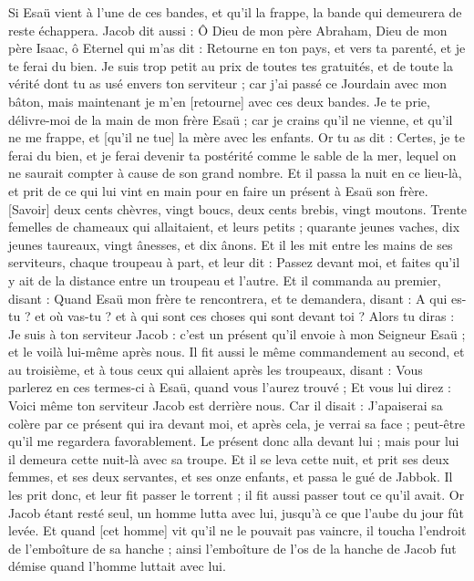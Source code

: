 \begin{multicols}{2}
Si Esaü vient à l'une de ces bandes, et qu'il la frappe, la bande qui demeurera de reste échappera.
Jacob dit aussi : Ô Dieu de mon père Abraham, Dieu de mon père Isaac, ô Eternel qui m'as dit : Retourne en ton pays, et vers ta parenté, et je te ferai du bien.
Je suis trop petit au prix de toutes tes gratuités, et de toute la vérité dont tu as usé envers ton serviteur ; car j'ai passé ce Jourdain avec mon bâton, mais maintenant je m'en [retourne] avec ces deux bandes.
Je te prie, délivre-moi de la main de mon frère Esaü ; car je crains qu'il ne vienne, et qu'il ne me frappe, et [qu'il ne tue] la mère avec les enfants.
Or tu as dit : Certes, je te ferai du bien, et je ferai devenir ta postérité comme le sable de la mer, lequel on ne saurait compter à cause de son grand nombre.
Et il passa la nuit en ce lieu-là, et prit de ce qui lui vint en main pour en faire un présent à Esaü son frère.
[Savoir] deux cents chèvres, vingt boucs, deux cents brebis, vingt moutons.
Trente femelles de chameaux qui allaitaient, et leurs petits ; quarante jeunes vaches, dix jeunes taureaux, vingt ânesses, et dix ânons.
Et il les mit entre les mains de ses serviteurs, chaque troupeau à part, et leur dit : Passez devant moi, et faites qu'il y ait de la distance entre un troupeau et l'autre.
Et il commanda au premier, disant : Quand Esaü mon frère te rencontrera, et te demandera, disant : A qui es-tu ? et où vas-tu ? et à qui sont ces choses qui sont devant toi ?
Alors tu diras : Je suis à ton serviteur Jacob : c'est un présent qu'il envoie à mon Seigneur Esaü ; et le voilà lui-même après nous.
Il fit aussi le même commandement au second, et au troisième, et à tous ceux qui allaient après les troupeaux, disant : Vous parlerez en ces termes-ci à Esaü, quand vous l'aurez trouvé ;
Et vous lui direz : Voici même ton serviteur Jacob est derrière nous. Car il disait : J'apaiserai sa colère par ce présent qui ira devant moi, et après cela, je verrai sa face ; peut-être qu'il me regardera favorablement.
Le présent donc alla devant lui ; mais pour lui il demeura cette nuit-là avec sa troupe.
Et il se leva cette nuit, et prit ses deux femmes, et ses deux servantes, et ses onze enfants, et passa le gué de Jabbok.
Il les prit donc, et leur fit passer le torrent ; il fit aussi passer tout ce qu'il avait.
Or Jacob étant resté seul, un homme lutta avec lui, jusqu'à ce que l'aube du jour fût levée.
Et quand [cet homme] vit qu'il ne le pouvait pas vaincre, il toucha l'endroit de l'emboîture de sa hanche ; ainsi l'emboîture de l'os de la hanche de Jacob fut démise quand l'homme luttait avec lui.

\end{multicols}
